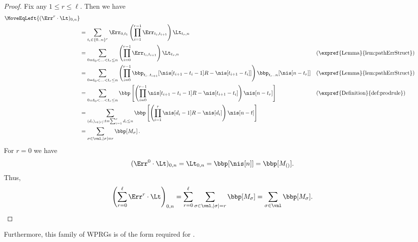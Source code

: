 \documentclass{toc}
\begin{document}
\begin{proof}
Fix any $1\leq r\leq \ell$. %
Then we have  %
\begin{align*}
    \MoveEqLeft{(\Err^r\cdot\Lt)_{0,n}}\\
    &= \sum_{t_i\in \{0..n\}^{r}}\Err_{0,t_1}\left(\prod_{i=1}^{r-1}\Err_{t_i,t_{i+1}}\right)\Lt_{t_r,n}\\
    &= \sum_{0=t_0<\ldots<t_r\leq n}\left(\prod_{i=0}^{r-1}\Err_{t_i,t_{i+1}}\right)\Lt_{t_r,n} && \text{(\expref{Lemma}{lem:pathErrStruct})}\\
    &= \sum_{0=t_0<\ldots<t_r\leq n}\left(\prod_{i=0}^{r-1}\bbp_{t_i..t_{i+1}}[\nis[t_{i+1}-t_i-1]R-\nis[t_{i+1}-t_i]]\right)\bbp_{t_r..n}[\nis[n-t_r]] && \text{(\expref{Lemma}{lem:pathErrStruct})}\\
    &= \sum_{0=t_0<\ldots<t_r\leq n}\bbp\left[\left(\prod_{i=0}^{r-1}\nis[t_{i+1}-t_i-1]R-\nis[t_{i+1}-t_i]\right)\nis[n-t_r]\right] && \text{(\expref{Definition}{def:prodrule})}\\
    &= \sum_{(d_i)_{i\in [r]}:t=\sum_{i=1}^rd_i\leq n}\bbp\left[\left(\prod_{i=1}^{r}\nis[d_i-1]R-\nis[d_i]\right)\nis[n-t]\right]\\
    &= \sum_{\sigma \in \vnl,|\sigma|=r}\bbp[M_\sigma]\,.
\end{align*} 
For $r=0$ we have $$(\Err^0\cdot\Lt)_{0,n}=\Lt_{0,n}=\bbp[\nis[n]]=\bbp[M_{()}].$$
Thus,
\[\left(\sum_{r=0}^\ell \Err^r\cdot\Lt\right)_{0,n}=\sum_{r=0}^\ell \sum_{\sigma \in \vnl,|\sigma|=r}\bbp[M_\sigma]= \sum_{\sigma \in \vnl}\bbp[M_\sigma].\qedhere\]
\end{proof}
Furthermore, this family of WPRGs is of the form required for .
\end{document}
